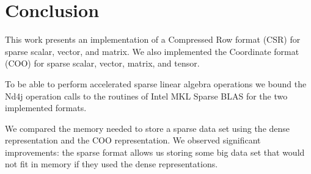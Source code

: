 \chapter{Conclusion}
 
 
 This work presents an implementation of a Compressed Row format (CSR) for sparse scalar, vector, and matrix. We also implemented the  Coordinate format (COO) for sparse scalar, vector, matrix, and tensor.
 
 To be able to perform accelerated sparse linear algebra operations we bound the Nd4j operation calls to the routines of Intel MKL Sparse BLAS for the two implemented formats.
 
 We compared the memory needed to store a sparse data set using the dense representation and the COO representation. We observed significant improvements: the sparse format allows us storing some big data set that would not fit in memory if they used the dense representations. 